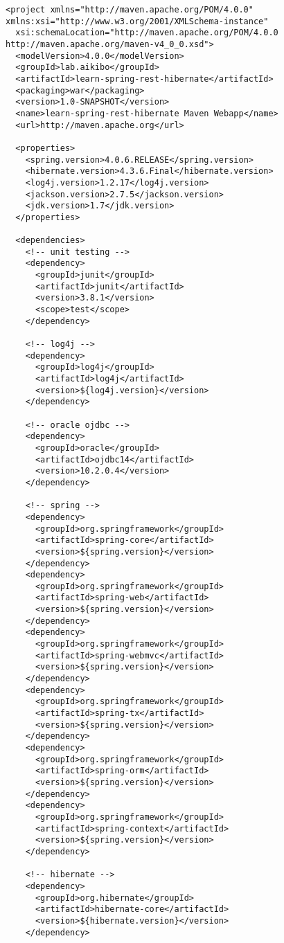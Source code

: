 \documentclass[pdftex,12pt, oneside]{article}
\begin{document}
\begin{lstlisting}
<project xmlns="http://maven.apache.org/POM/4.0.0" xmlns:xsi="http://www.w3.org/2001/XMLSchema-instance"
  xsi:schemaLocation="http://maven.apache.org/POM/4.0.0 http://maven.apache.org/maven-v4_0_0.xsd">
  <modelVersion>4.0.0</modelVersion>
  <groupId>lab.aikibo</groupId>
  <artifactId>learn-spring-rest-hibernate</artifactId>
  <packaging>war</packaging>
  <version>1.0-SNAPSHOT</version>
  <name>learn-spring-rest-hibernate Maven Webapp</name>
  <url>http://maven.apache.org</url>

  <properties>
    <spring.version>4.0.6.RELEASE</spring.version>
    <hibernate.version>4.3.6.Final</hibernate.version>
    <log4j.version>1.2.17</log4j.version>
    <jackson.version>2.7.5</jackson.version>
    <jdk.version>1.7</jdk.version>
  </properties>

  <dependencies>
    <!-- unit testing -->
    <dependency>
      <groupId>junit</groupId>
      <artifactId>junit</artifactId>
      <version>3.8.1</version>
      <scope>test</scope>
    </dependency>

    <!-- log4j -->
    <dependency>
      <groupId>log4j</groupId>
      <artifactId>log4j</artifactId>
      <version>${log4j.version}</version>
    </dependency>

    <!-- oracle ojdbc -->
    <dependency>
      <groupId>oracle</groupId>
      <artifactId>ojdbc14</artifactId>
      <version>10.2.0.4</version>
    </dependency>

    <!-- spring -->
    <dependency>
      <groupId>org.springframework</groupId>
      <artifactId>spring-core</artifactId>
      <version>${spring.version}</version>
    </dependency>
    <dependency>
      <groupId>org.springframework</groupId>
      <artifactId>spring-web</artifactId>
      <version>${spring.version}</version>
    </dependency>
    <dependency>
      <groupId>org.springframework</groupId>
      <artifactId>spring-webmvc</artifactId>
      <version>${spring.version}</version>
    </dependency>
    <dependency>
      <groupId>org.springframework</groupId>
      <artifactId>spring-tx</artifactId>
      <version>${spring.version}</version>
    </dependency>
    <dependency>
      <groupId>org.springframework</groupId>
      <artifactId>spring-orm</artifactId>
      <version>${spring.version}</version>
    </dependency>
    <dependency>
      <groupId>org.springframework</groupId>
      <artifactId>spring-context</artifactId>
      <version>${spring.version}</version>
    </dependency>

    <!-- hibernate -->
    <dependency>
      <groupId>org.hibernate</groupId>
      <artifactId>hibernate-core</artifactId>
      <version>${hibernate.version}</version>
    </dependency>
    

\end{lstlisting}
\end{document}
